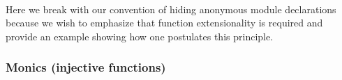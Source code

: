 \begin{code}
\>[0]\AgdaSpace{}%
\AgdaModule{\AgdaUnderscore{}}\AgdaSpace{}%
\AgdaSymbol{\{}\AgdaSpace{}%
\AgdaSpace{}%
\AgdaSymbol{:}\AgdaSpace{}%
\AgdaSymbol{\}\{}\AgdaSpace{}%
\AgdaSymbol{:}\AgdaSpace{}%
\AgdaSpace{}%
\AgdaSpace{}%
\AgdaSymbol{\}\{}\AgdaSpace{}%
\AgdaSymbol{:}\AgdaSpace{}%
\AgdaSpace{}%
\AgdaSymbol{\}\{}\AgdaSpace{}%
\AgdaSymbol{:}\AgdaSpace{}%
\AgdaSpace{}%
\AgdaSymbol{\}}\AgdaSpace{}%
\<%
\\
%
\\[\AgdaEmptyExtraSkip]%
\>[0][@{}l@{\AgdaIndent{0}}]%
\>[1]\AgdaSpace{}%
\AgdaSymbol{:}\AgdaSpace{}%
\AgdaSymbol{(}\AgdaSpace{}%
\AgdaSymbol{:}\AgdaSpace{}%
\AgdaSpace{}%
\AgdaSpace{}%
\AgdaSymbol{)(}\AgdaSpace{}%
\AgdaSymbol{:}\AgdaSpace{}%
\AgdaSpace{}%
\AgdaSymbol{)}\AgdaSpace{}%
\AgdaSpace{}%
\AgdaSpace{}%
\AgdaSpace{}%
\AgdaSymbol{(}\AgdaSpace{}%
\AgdaSpace{}%
\AgdaSymbol{)}\AgdaSpace{}%
\AgdaSpace{}%
\AgdaSpace{}%
\<%
\\
%
\>[1]\AgdaSpace{}%
\AgdaSpace{}%
\AgdaSpace{}%
\AgdaSymbol{=}\AgdaSpace{}%
\AgdaSpace{}%
\AgdaSpace{}%
\AgdaSpace{}%
\AgdaSpace{}%
\AgdaSpace{}%
\AgdaSpace{}%
\AgdaSymbol{(}\AgdaSpace{}%
\AgdaSymbol{))}\<%
\end{code}
\ccpad
Here we break with our convention of hiding anonymous module declarations because we wish to emphasize that function extensionality is required and provide an example showing how one postulates this principle.


\subsubsection{Monics (injective functions)}\label{injective-functions}


